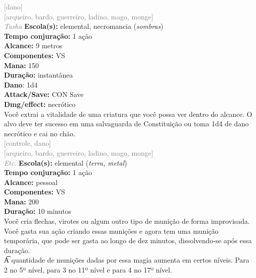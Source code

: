 \documentclass{RPG_Adventure}[2021/10/20]
\begin{document}
{\scriptsize \textcolor{gray}{[dano]\\}}
{\scriptsize \textcolor{gray}{[arqueiro, bardo, guerreiro, ladino, mago, monge]\\}}
{\tiny \textcolor{gray}{\textit{Tasha}}}
{\small \t \textbf{Escola(s):} elemental, necromancia (\textit{sombras})\\\t \textbf{Tempo conjuração:} 1 ação\\\t \textbf{Alcance:} 9 metros\\\t \textbf{Componentes:} VS\\\t \textbf{Mana:} 150\\\t \textbf{Duração:} instantânea\\\t \textbf{Dano}: 1d4\\\t \textbf{Attack/Save:} CON Save\\\t \textbf{Dmg/effect:} necrótico\\}
{\normalsize Você extrai a vitalidade de uma criatura que você possa ver dentro do alcance. O alvo deve ter sucesso em uma salvaguarda de Constituição ou toma 1d4 de dano necrótico e cai no chão.\\}
{\scriptsize \textcolor{gray}{[controle, dano]\\}}
{\scriptsize \textcolor{gray}{[arqueiro, bardo, guerreiro, ladino, mago, monge]\\}}
{\tiny \textcolor{gray}{\textit{Etc.}}}
{\small \t \textbf{Escola(s):} elemental (\textit{terra, metal})\\\t \textbf{Tempo conjuração:} 1 ação\\\t \textbf{Alcance:} pessoal\\\t \textbf{Componentes:} VS\\\t \textbf{Mana:} 200\\\t \textbf{Duração:} 10 minutos\\}
{\normalsize Você cria flechas, virotes ou algum outro tipo de munição de forma improvisada. Você gasta sua ação criando essas munições e agora tem uma munição temporária, que pode ser gasta ao longo de dez minutos, dissolvendo-se após essa duração.\\\t A quantidade de munições dadas por essa magia aumenta em certos níveis. Para 2 no 5º nível, para 3 no 11º nível e para 4 no 17º nível.\\}
\end{document}
